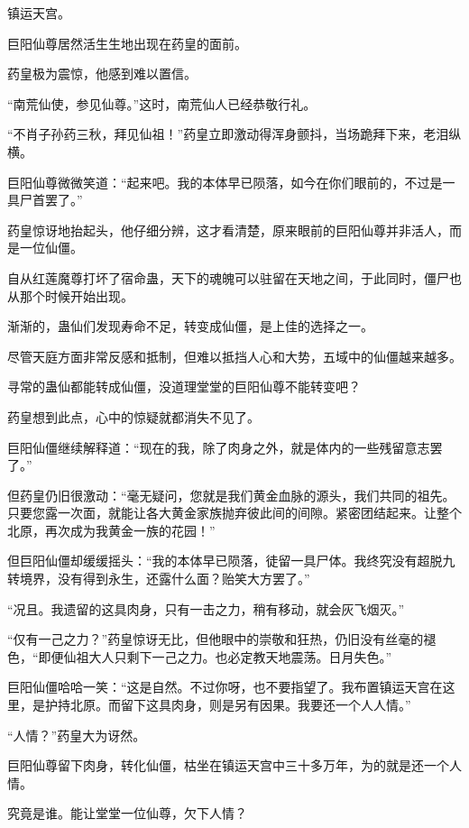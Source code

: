 
\begin{this_body}

镇运天宫。

巨阳仙尊居然活生生地出现在药皇的面前。

药皇极为震惊，他感到难以置信。

“南荒仙使，参见仙尊。”这时，南荒仙人已经恭敬行礼。

“不肖子孙药三秋，拜见仙祖！”药皇立即激动得浑身颤抖，当场跪拜下来，老泪纵横。

巨阳仙尊微微笑道：“起来吧。我的本体早已陨落，如今在你们眼前的，不过是一具尸首罢了。”

药皇惊讶地抬起头，他仔细分辨，这才看清楚，原来眼前的巨阳仙尊并非活人，而是一位仙僵。

自从红莲魔尊打坏了宿命蛊，天下的魂魄可以驻留在天地之间，于此同时，僵尸也从那个时候开始出现。

渐渐的，蛊仙们发现寿命不足，转变成仙僵，是上佳的选择之一。

尽管天庭方面非常反感和抵制，但难以抵挡人心和大势，五域中的仙僵越来越多。

寻常的蛊仙都能转成仙僵，没道理堂堂的巨阳仙尊不能转变吧？

药皇想到此点，心中的惊疑就都消失不见了。

巨阳仙僵继续解释道：“现在的我，除了肉身之外，就是体内的一些残留意志罢了。”

但药皇仍旧很激动：“毫无疑问，您就是我们黄金血脉的源头，我们共同的祖先。只要您露一次面，就能让各大黄金家族抛弃彼此间的间隙。紧密团结起来。让整个北原，再次成为我黄金一族的花园！”

但巨阳仙僵却缓缓摇头：“我的本体早已陨落，徒留一具尸体。我终究没有超脱九转境界，没有得到永生，还露什么面？贻笑大方罢了。”

“况且。我遗留的这具肉身，只有一击之力，稍有移动，就会灰飞烟灭。”

“仅有一己之力？”药皇惊讶无比，但他眼中的崇敬和狂热，仍旧没有丝毫的褪色，“即便仙祖大人只剩下一己之力。也必定教天地震荡。日月失色。”

巨阳仙僵哈哈一笑：“这是自然。不过你呀，也不要指望了。我布置镇运天宫在这里，是护持北原。而留下这具肉身，则是另有因果。我要还一个人人情。”

“人情？”药皇大为讶然。

巨阳仙尊留下肉身，转化仙僵，枯坐在镇运天宫中三十多万年，为的就是还一个人情。

究竟是谁。能让堂堂一位仙尊，欠下人情？


\end{this_body}
